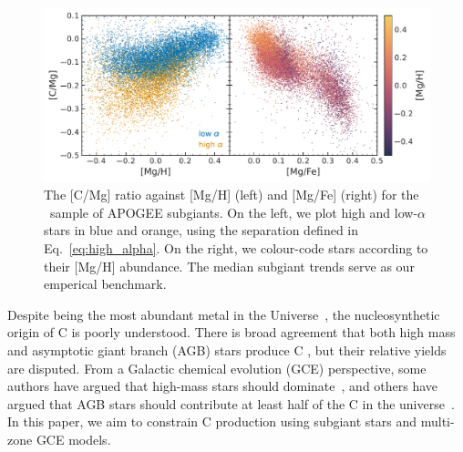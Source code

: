 \documentclass[fleqn,
referee, %
usenatbib]{mnras}
\newcommand{\apogee}{APOGEE}
\newcommand{\dbstrike}[1]{{\color{Thistle} \sout{#1} }}
\newcommand{\dbadd}[1]{{\color{Thistle} #1}}
\newcommand{\dbnote}[1]{ {\color{Thistle} \textit{\small (DB: #1)}} }
\begin{document}
\begin{figure}
    \centering
    \includegraphics{subgiants.pdf}
    \caption{The [C/Mg] ratio against [Mg/H] (left) and [Mg/Fe] (right) for the \citet{jack}~sample of \apogee{} subgiants. On the left, we plot high and low-$\alpha$ stars in blue and orange, using the separation defined in Eq.~\ref{eq:high_alpha}.  On the right, we colour-code stars according to their [Mg/H] abundance. The median subgiant trends serve as our emperical benchmark. } \label{fig:subgiants}
\end{figure}



Despite being the most abundant metal in the Universe~\citep[e.g.][]{magg+22}, the nucleosynthetic origin of C is poorly understood. 
There is broad agreement that both high mass and asymptotic giant branch (AGB) stars produce C \citep{jennifer19}, but their relative yields are disputed.
From a Galactic chemical evolution (GCE) perspective, some authors have argued that high-mass stars should dominate~\citep[e.g.][]{prantzos+94, HEK00, romano+20, franchini+20, gustafsson22}, and others have argued that AGB stars should contribute at least half of the C in the universe~\citep[e.g.][]{tinsley79, chiappini+03, mattsson10, KKU11, rybizki+17, KKL20}. 
In this paper, we aim to constrain C production using subgiant stars and multi-zone GCE models.%

\end{document}
